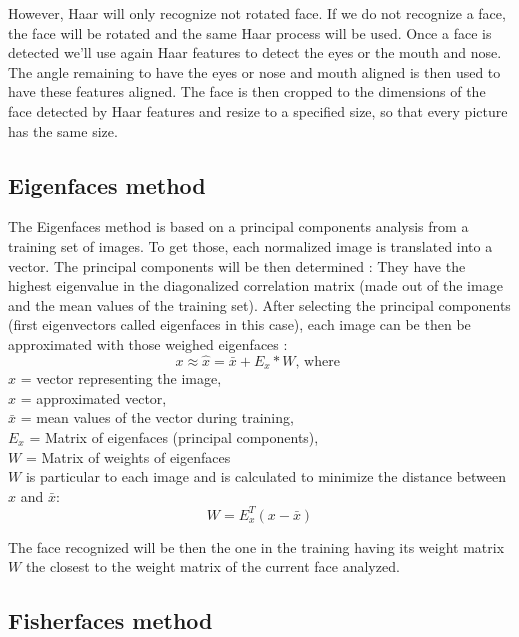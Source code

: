 However, Haar will only recognize not rotated face. If we do not recognize a face, the face will be rotated and the same Haar process will be used. Once a face is detected we'll use again Haar features to detect the eyes or the mouth and nose. The angle remaining to have the eyes or nose and mouth aligned is then used to have these features aligned. The face is then cropped to the dimensions of the face detected by Haar features and resize to a specified size, so that every picture has the same size.

\subsection{Eigenfaces method}

The Eigenfaces method is based on a principal components analysis from a training set of images. To get those, each normalized image is translated into a vector. The principal components will be then determined : They have the highest eigenvalue in the diagonalized correlation matrix (made out of the image and the mean values of the training set). After selecting the principal components (first eigenvectors called eigenfaces in this case), each image can be then be approximated with those weighed eigenfaces :
\begin{equation}
x \approx  \hat{x} = \bar{x} + E_{x} * W \textrm{, where } 
\end{equation}
$x$ = vector representing the image,\\
$\hat{x}$ = approximated vector,\\
$\bar{x}$ = mean values of the vector during training,\\
$E_{x}$ = Matrix of eigenfaces (principal components),\\
$W$ = Matrix of weights of eigenfaces\\

$W$ is particular to each image and is calculated to minimize the distance between $x$ and $\bar{x}$:
\begin{equation}
W = E_{x}^T (x-\bar{x}) 
\end{equation}

The face recognized will be then the one in the training having its weight matrix $W$ the closest to the weight matrix of the current face analyzed. 

\subsection{Fisherfaces method}

